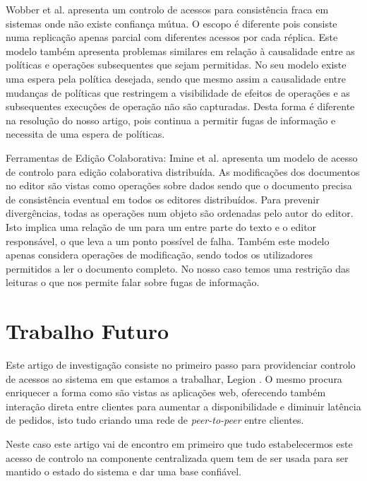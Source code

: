 \documentclass[runningheads,a4paper]{llncs}
\begin{document}
Wobber et al. \cite{wobber2010policy} apresenta um controlo de acessos para consistência fraca em sistemas onde não existe confiança mútua. O escopo é diferente pois consiste numa replicação apenas parcial com diferentes acessos por cada réplica. Este modelo também apresenta problemas similares em relação à causalidade entre as políticas e operações subsequentes que sejam permitidas. No seu modelo existe uma espera pela política desejada, sendo que mesmo assim a causalidade entre mudanças de políticas que restringem a visibilidade de efeitos de operações e as subsequentes  execuções de operação não são capturadas. Desta forma é diferente na resolução do nosso artigo, pois continua a permitir fugas de informação e necessita de uma espera de políticas.

Ferramentas de Edição Colaborativa: Imine et al. \cite{imine2009flexible} apresenta um modelo de acesso de controlo para edição colaborativa distribuída. As modificações dos documentos no editor são vistas como operações sobre dados sendo que o documento precisa de consistência eventual em todos os editores distribuídos. Para prevenir divergências, todas as operações num objeto são ordenadas pelo autor do editor. Isto implica uma relação de um para um entre parte do texto e o editor responsável, o que leva a um ponto possível de falha. Também este modelo apenas considera operações de modificação, sendo todos os utilizadores permitidos a ler o documento completo. No nosso caso temos uma restrição das leituras o que nos permite falar sobre fugas de informação.


\section{Trabalho Futuro}\label{sec:future work}

Este artigo de investigação consiste no primeiro passo para providenciar controlo de acessos ao sistema em que estamos a trabalhar, Legion \cite{mastersthesis}. O mesmo procura enriquecer a forma como são vistas as aplicações web, oferecendo também interação direta entre clientes para aumentar a disponibilidade e diminuir latência de pedidos, isto tudo criando uma rede de \textit{peer-to-peer} entre clientes.

Neste caso este artigo vai de encontro em primeiro que tudo estabelecermos este acesso de controlo na componente centralizada quem tem de ser usada para ser mantido o estado do sistema e dar uma base confiável. 
\end{document}
